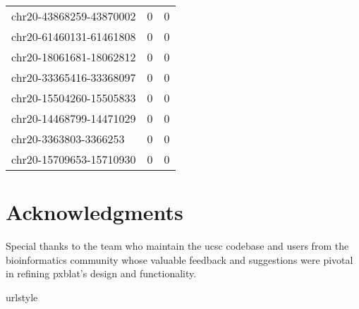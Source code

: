 \documentclass[10pt,letterpaper]{article}
\begin{document}
{\begin{longtable}{lSS}
	chr20-43868259-43870002 & 0      & 0        \\
	chr20-61460131-61461808 & 0      & 0        \\
	chr20-18061681-18062812 & 0      & 0        \\
	chr20-33365416-33368097 & 0      & 0        \\
	chr20-15504260-15505833 & 0      & 0        \\
	chr20-14468799-14471029 & 0      & 0        \\
	chr20-3363803-3366253   & 0      & 0        \\
	chr20-15709653-15710930 & 0      & 0        \\
\end{longtable}



\section*{Acknowledgments}

Special thanks to the team who maintain the \gls{ucsc} codebase and users from the bioinformatics community whose valuable feedback and suggestions were pivotal in refining \gls{pxblat}'s design and functionality.

\nolinenumbers

%
%
%
%
%
%
%
%
\begin{thebibliography}{7}
	\providecommand{\natexlab}[1]{#1}
	\providecommand{\url}[1]{\texttt{#1}}
	\expandafter\ifx\csname urlstyle\endcsname\relax
		\providecommand{\doi}[1]{doi: #1}\else
		\providecommand{\doi}{doi: \begingroup \urlstyle{rm}\Url}\fi


\end{thebibliography}}
\end{document}
